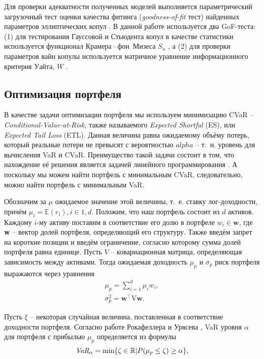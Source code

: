 Для проверки адекватности полученных моделей выполняется параметрический загрузочный тест оценки качества фитинга (\textit{goodness-of-fit} тест) найденных параметров эллиптических копул \cite{Gen2009}.
В данной работе используется два GoF-теста: (1) для тестирования Гауссовой и Стьюдента копул в качестве статистики используется функционал Крамера\,--\,фон~Мизеса $S_n$ \cite{Gen2009}, а (2) для проверки параметров вайн копулы используется матричное уравнение информационного критерия Уайта, $W$ \cite{White1982}.

\subsection{Оптимизация портфеля}

В качестве задачи оптимизации портфеля мы используем минимизацию CVaR -- \textit{Conditional-Value-at-Risk}, также называемого \textit{Expected Shortfal} (ES), или \textit{Expected Tail Loss} (ETL). 
Данная величина равна ожидаемому объёму потерь, который реальные потери не превысят с вероятностью $alpha$ -- т.~н. уровень для вычисления VaR и CVaR.
Преимущество такой задачи состоит в том, что нахождение её решения является задачей линейного программирования \cite{Rock2000}. 
А поскольку мы можем найти портфель с минимальным CVaR, следовательно, можно найти портфель с минимальным VaR. 

Обозначим за $\mu$ ожидаемое значение этой величины, т.~е. ставку лог-доходности, причём $\mu_i = \mathbb{E}(r_i), i \in \overline{1,d}$. 
Положим, что наш портфель состоит из $d$ активов. 
Каждому $i$-му активу поставим в соответствие его долю в портфеле $w_i \in \textbf{w}$, где \textbf{w} -- вектор долей портфеля, определяющий его структуру. 
Также введём запрет на короткие позиции и введём ограничение, согласно которому сумма долей портфеля равна единице.
Пусть $V$ -- ковариационная матрица, определяющая зависимость между активами.
Тогда ожидаемая доходность $\mu_p$ и $\sigma_p$ риск портфеля выражаются через уравнения
%
\begin{gather}\label{portretandrisk}
\mu_p = \sum_{i=1}^d \mu_i w_i,\\
\sigma_p^2 = \textbf{w}^\intercal \text{V} \textbf{w}.
\end{gather}
 
Пусть $\xi$ -- некоторая случайная величина, поставленная в соответствие доходности портфеля.
Согласно работе Рокафеллера и Урясева \cite{Rock2000}, VaR уровня $\alpha$ для портфеля с прибылью $\mu_p$ определяется из формулы
%
\begin{equation} \label{VaR}
    \emph{VaR}_\alpha = \text{min}\{\zeta \in \mathbb{R}|P(\mu_p \le \zeta) \ge \alpha \},
\end{equation}

